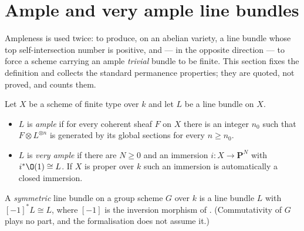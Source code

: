 \section{Ample and very ample line bundles}\label{sec:deg-ample}

Ampleness is used twice: to produce, on an abelian variety, a line bundle whose
top self-intersection number is positive, and --- in the opposite direction ---
to force a scheme carrying an ample \emph{trivial} bundle to be finite.  This
section fixes the definition and collects the standard permanence properties;
they are quoted, not proved, and  counts them.

\begin{definition}\label{def:deg-ample}
Let $X$ be a scheme of finite type over $k$ and let $L$ be a line bundle on
$X$.
\begin{itemize}
  \item $L$ is \emph{ample} if for every coherent sheaf $F$ on $X$ there is an
  integer $n_0$ such that $F\otimes L^{\otimes n}$ is generated by its global
  sections for every $n\geq n_0$.
  \item $L$ is \emph{very ample} if there are $N\geq0$ and an immersion
  $i\colon X\to\mathbf P^N$ with $i^*\O(1)\cong L$.  If $X$ is proper over $k$
  such an immersion is automatically a closed immersion.
\end{itemize}
A \emph{symmetric} line bundle on a group scheme $G$ over $k$ is a line bundle
$L$ with $[-1]^*L\cong L$, where $[-1]$ is the inversion morphism of
.  (Commutativity of $G$ plays no part, and the
formalisation does not assume it.)
\end{definition}

